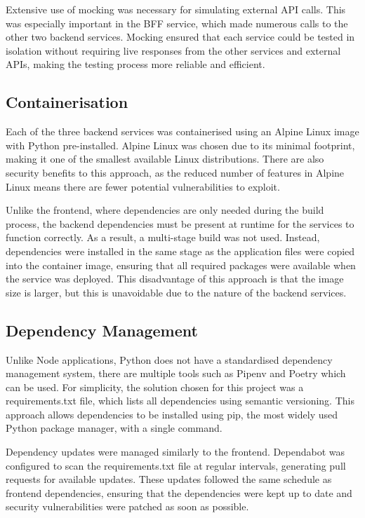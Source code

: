 Extensive use of mocking was necessary for simulating external API calls. This was especially important in the BFF service, which made numerous calls to the other two backend services. Mocking ensured that each service could be tested in isolation without requiring live responses from the other services and  external APIs, making the testing process more reliable and efficient.

\subsection{Containerisation}
Each of the three backend services was containerised using an Alpine Linux image with Python pre-installed. Alpine Linux was chosen due to its minimal footprint, making it one of the smallest available Linux distributions. There are also security benefits to this approach, as the reduced number of features in Alpine Linux means there are fewer potential vulnerabilities to exploit.

Unlike the frontend, where dependencies are only needed during the build process, the backend dependencies must be present at runtime for the services to function correctly. As a result, a multi-stage build was not used. Instead, dependencies were installed in the same stage as the application files were copied into the container image, ensuring that all required packages were available when the service was deployed. This disadvantage of this approach is that the image size is larger, but this is unavoidable due to the nature of the backend services.

\subsection{Dependency Management}
Unlike Node applications, Python does not have a standardised dependency management system, there are multiple tools such as Pipenv and Poetry which can be used. For simplicity, the solution chosen for this project was a requirements.txt file, which lists all dependencies using semantic versioning. This approach allows dependencies to be installed using pip, the most widely used Python package manager, with a single command.

Dependency updates were managed similarly to the frontend. Dependabot was configured to scan the requirements.txt file at regular intervals, generating pull requests for available updates. These updates followed the same schedule as frontend dependencies, ensuring that the dependencies were kept up to date and security vulnerabilities were patched as soon as possible.

